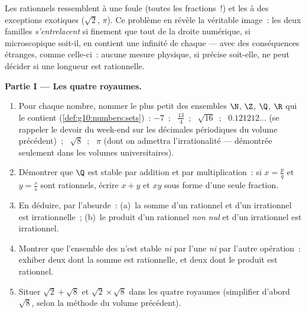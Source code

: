 \begin{problem}
\label{pb:g10:numbers:1}
Les rationnels ressemblent à une foule (toutes les fractions~!) et les
 à des exceptions exotiques ($\sqrt2$, $\pi$). Ce problème
en révèle la véritable image~: les deux familles \emph{s'entrelacent}
si finement que tout  de la droite numérique, si
microscopique soit-il, en contient une infinité de chaque --- avec des
conséquences étranges, comme celle-ci~: aucune mesure physique, si
précise soit-elle, ne peut décider si une longueur est rationnelle.

\medskip
\noindent\textbf{Partie I --- Les quatre royaumes.}
\begin{enumerate}
  \item Pour chaque nombre, nommer le plus petit des ensembles $\N$,
        $\Z$, $\Q$, $\R$ qui le contient
        (\cref{def:g10:numbers:sets})~: $-7$~; \ $\frac{13}{4}$~; \
        $\sqrt{16}$~; \ $0.121212\ldots$ (se rappeler le devoir du
        week-end sur les décimales périodiques du volume
        précédent)~; \ $\sqrt8$~; \ $\pi$ (dont on admettra
        l'irrationalité --- démontrée seulement dans les volumes
        universitaires).
  \item Démontrer que $\Q$ est stable par addition et par
        multiplication~: si $x = \frac pq$ et $y = \frac rs$ sont
        rationnels, écrire $x + y$ et $xy$ sous forme d'une seule
        fraction.
  \item En déduire, par l'absurde~: (a)~la somme d'un rationnel et
        d'un irrationnel est irrationnelle~; (b)~le produit d'un
        rationnel \emph{non nul} et d'un irrationnel est irrationnel.
  \item Montrer que l'ensemble des  n'est stable
        \emph{ni} par l'une \emph{ni} par l'autre opération~: exhiber
        deux \omterm{ex:g10:numbers:classify}{irrationnels} dont la somme est rationnelle, et deux dont
        le produit est rationnel.
  \item Situer $\sqrt2 + \sqrt8$ et $\sqrt2 \times \sqrt8$ dans les
        quatre royaumes (simplifier d'abord $\sqrt8$, selon la méthode
        du volume précédent).
\end{enumerate}


\end{problem}
